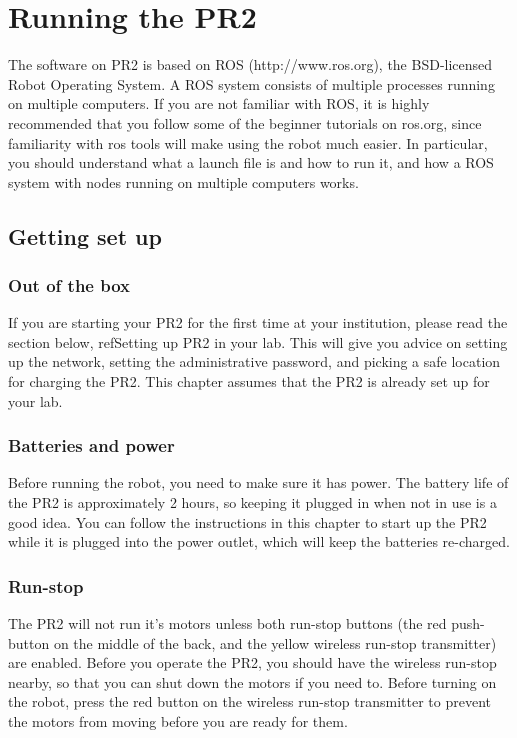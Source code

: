 \chapter{Running the PR2}
The software on PR2 is based on ROS (http://www.ros.org), the BSD-licensed Robot Operating System.  A ROS system consists of multiple processes running on multiple computers.  If you are not familiar with ROS, it is highly recommended that you follow some of the beginner tutorials on ros.org, since familiarity with ros tools will make using the robot much easier.  In particular, you should understand what a launch file is and how to run it, and how a ROS system with nodes running on multiple computers works.


\section{Getting set up}
\subsection{Out of the box}
If you are starting your PR2 for the first time at your institution, please read the section below, ref{Setting up PR2 in your lab}.  This will give you advice on setting up the network, setting the administrative password, and picking a safe location for charging the PR2.  This chapter assumes that the PR2 is already set up for your lab.
\subsection{Batteries and power}
Before running the robot, you need to make sure it has power.  The battery life of the PR2 is approximately 2 hours, so keeping it plugged in when not in use is a good idea.  You can follow the instructions in this chapter to start up the PR2 while it is plugged into the power outlet, which will keep the batteries re-charged.
\subsection{Run-stop}
The PR2 will not run it's motors unless both run-stop buttons (the red push-button on the middle of the back, and the yellow wireless run-stop transmitter) are enabled.  Before you operate the PR2, you should have the wireless run-stop nearby, so that you can shut down the motors if you need to.  Before turning on the robot, press the red button on the wireless run-stop transmitter to prevent the motors from moving before you are ready for them.
